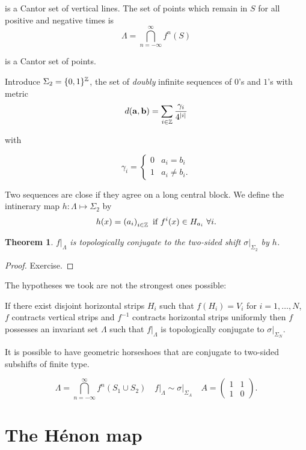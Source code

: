\documentclass{notes}
\theoremstyle{plain}
\newtheorem{theorem}[proposition]{Theorem}
\begin{document}
is a Cantor set of vertical lines.  The set of points
which remain in $S$ for all positive and negative times is
\[
\Lambda = \bigcap_{n=-\infty}^\infty f^n(S)
\]

is a Cantor set of points.

Introduce $\Sigma_2 = \{ 0,1\}^{\mathbb{Z}}$, the set of
\emph{doubly} infinite sequences of $0$'s and $1$'s with metric
\[
d(\mathbf{a},\mathbf{b}) = \sum_{i \in \mathbb{Z}} \frac{\gamma_i}{4^{\left|i\right|}}
\]

with

\[
\gamma_i = \begin{cases}
0 & a_i = b_i \\
1 & a_i \neq b_i.
\end{cases}
\]

Two sequences are close if they agree on a long central block.  We define
the intinerary map $h \colon \Lambda \mapsto \Sigma_2$ by
\[
h(x) = \left( a_i \right)_{i \in \mathbb{Z}} \text{ if }
f^i(x) \in H_{a_i}\ \forall i.
\]

\vspace{2in}

\begin{theorem}
$\left. f\right|_\Lambda$ is topologically conjugate to the
two-sided shift $\left. \sigma \right|_{\Sigma_2}$ by $h$.
\end{theorem}

\begin{proof}
Exercise.
\end{proof}

The hypotheses we took are not the strongest ones possible:

If there exist disjoint horizontal strips $H_i$ such that
$f(H_i) = V_i$ for $i = 1,\dots,N$, $f$ contracts vertical strips
and $f^{-1}$ contracts horizontal strips uniformly then
$f$ possesses an invariant set $\Lambda$ such that
$\left. f\right|_\Lambda$ is topologically conjugate to
$\left. \sigma \right|_{\Sigma_N}$.

It is possible to have geometric horseshoes that are conjugate to
two-sided subshifts of finite type.

\vspace{2in}

\[
\Lambda = \bigcap_{n=-\infty}^\infty f^n(S_1 \cup S_2) \quad
\left. f\right|_\Lambda \sim \left. \sigma \right|_{\Sigma_A} \quad
A = \begin{pmatrix}
1 & 1 \\ 1 & 0
\end{pmatrix}.
\]

\section{The H\'enon map}
\end{document}
